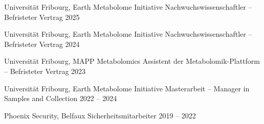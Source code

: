 

\begin{cventries}


\cventrynoloc
  {Universität Fribourg, Earth Metabolome Initiative} %
  {Nachwuchswissenschaftler – Befristeter Vertrag} %
  {2025} %
  {}

\cventrynoloc
  {Universität Fribourg, Earth Metabolome Initiative} %
  {Nachwuchswissenschaftler – Befristeter Vertrag} %
  {2024} %
  {}

\cventrynoloc
  {Universität Fribourg, MAPP Metabolomics} %
  {Assistent der Metabolomik-Plattform – Befristeter Vertrag} %
  {2023} %
  {}

\cventrynoloc
  {Universität Fribourg, Earth Metabolome Initiative} %
  {Masterarbeit – Manager in Samples and Collection} %
  {2022 -- 2024} %
  {}

\cventrynoloc
  {Phoenix Security, Belfaux} %
  {Sicherheitsmitarbeiter} %
  {2019 -- 2022} %
  {}

\end{cventries}
